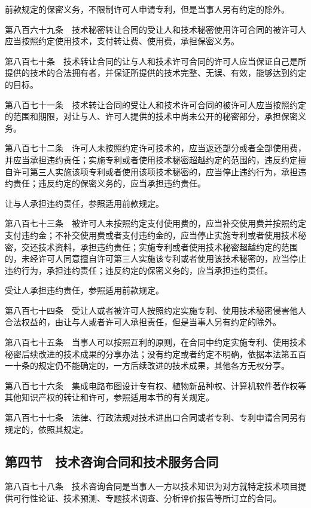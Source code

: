 \documentclass[UTF8,12pt,a4paper]{ctexbook}
\begin{document}
前款规定的保密义务，不限制许可人申请专利，但是当事人另有约定的除外。

第八百六十九条　技术秘密转让合同的受让人和技术秘密使用许可合同的被许可人应当按照约定使用技术，支付转让费、使用费，承担保密义务。

第八百七十条　技术转让合同的让与人和技术许可合同的许可人应当保证自己是所提供的技术的合法拥有者，并保证所提供的技术完整、无误、有效，能够达到约定的目标。

第八百七十一条　技术转让合同的受让人和技术许可合同的被许可人应当按照约定的范围和期限，对让与人、许可人提供的技术中尚未公开的秘密部分，承担保密义务。

第八百七十二条　许可人未按照约定许可技术的，应当返还部分或者全部使用费，并应当承担违约责任；实施专利或者使用技术秘密超越约定的范围的，违反约定擅自许可第三人实施该项专利或者使用该项技术秘密的，应当停止违约行为，承担违约责任；违反约定的保密义务的，应当承担违约责任。

让与人承担违约责任，参照适用前款规定。

第八百七十三条　被许可人未按照约定支付使用费的，应当补交使用费并按照约定支付违约金；不补交使用费或者支付违约金的，应当停止实施专利或者使用技术秘密，交还技术资料，承担违约责任；实施专利或者使用技术秘密超越约定的范围的，未经许可人同意擅自许可第三人实施该专利或者使用该技术秘密的，应当停止违约行为，承担违约责任；违反约定的保密义务的，应当承担违约责任。

受让人承担违约责任，参照适用前款规定。

第八百七十四条　受让人或者被许可人按照约定实施专利、使用技术秘密侵害他人合法权益的，由让与人或者许可人承担责任，但是当事人另有约定的除外。

第八百七十五条　当事人可以按照互利的原则，在合同中约定实施专利、使用技术秘密后续改进的技术成果的分享办法；没有约定或者约定不明确，依据本法第五百一十条的规定仍不能确定的，一方后续改进的技术成果，其他各方无权分享。

第八百七十六条　集成电路布图设计专有权、植物新品种权、计算机软件著作权等其他知识产权的转让和许可，参照适用本节的有关规定。

第八百七十七条　法律、行政法规对技术进出口合同或者专利、专利申请合同另有规定的，依照其规定。

\subsection*{第四节　技术咨询合同和技术服务合同}

第八百七十八条　技术咨询合同是当事人一方以技术知识为对方就特定技术项目提供可行性论证、技术预测、专题技术调查、分析评价报告等所订立的合同。
\end{document}
